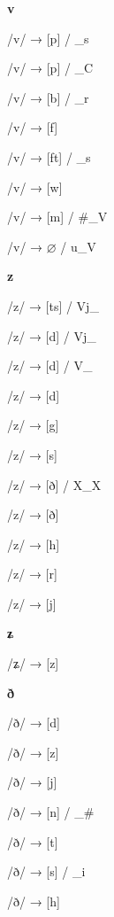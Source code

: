 \begin{center}\textbf{v}\end{center}
\begin{multicols}{4}
\noindent /v/ → [p] / \_s

\noindent /v/ → [p] / \_C

\noindent /v/ → [b] / \_r

\noindent /v/ → [f]

\noindent /v/ → [ft] / \_s

\noindent /v/ → [w]

\noindent /v/ → [m] / \#\_V

\noindent /v/ → $\varnothing$ / u\_V
\end{multicols}

\begin{center}\textbf{z}\end{center}
\begin{multicols}{4}
\noindent /z/ → [ts] / Vj\_

\noindent /z/ → [d] / Vj\_

\noindent /z/ → [d] / V\_

\noindent /z/ → [d]

\noindent /z/ → [g]

\noindent /z/ → [s]

\noindent /z/ → [ð] / X\_X

\noindent /z/ → [ð]

\noindent /z/ → [h]

\noindent /z/ → [r]

\noindent /z/ → [j]
\end{multicols}


\begin{center}\textbf{ʑ}\end{center}
\begin{multicols}{4}
\noindent /ʑ/ → [z]
\end{multicols}


\begin{center}\textbf{ð}\end{center}
\begin{multicols}{4}
\noindent /ð/ → [d]

\noindent /ð/ → [z]

\noindent /ð/ → [j]

\noindent /ð/ → [n] / \_\#

\noindent /ð/ → [t]

\noindent /ð/ → [s] / \_i

\noindent /ð/ → [h]
\end{multicols}

